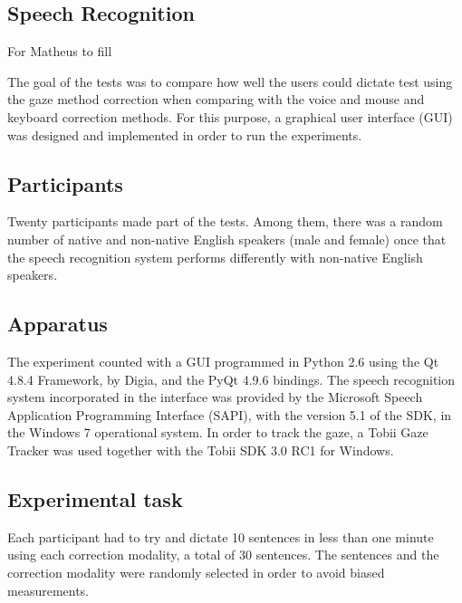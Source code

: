 \documentclass[]{article}
\begin{document}
\subsection{Speech Recognition}
For Matheus to fill


The goal of the tests was to compare how well the users could dictate test using the gaze method correction when comparing with the voice and mouse and keyboard correction methods. For this purpose, a graphical user interface (GUI) was designed and implemented in order to run the experiments.

\subsection{Participants}
Twenty participants made part of the tests. Among them, there was a random number of native and non-native English speakers (male and female) once that the speech recognition system performs differently with non-native English speakers.

\subsection{Apparatus}
The experiment counted with a GUI programmed in Python 2.6 using the Qt 4.8.4 Framework, by Digia, and the PyQt 4.9.6 bindings. The speech recognition system incorporated in the interface was provided by the Microsoft Speech Application Programming Interface (SAPI), with the version 5.1 of the SDK, in the Windows 7 operational system. In order to track the gaze, a Tobii Gaze Tracker was used together with the Tobii SDK 3.0 RC1 for Windows.

\subsection{Experimental task}
Each participant had to try and dictate 10 sentences in less than one minute using each correction modality, a total of 30 sentences. The sentences and the correction modality were randomly selected in order to avoid biased measurements.
\end{document}
